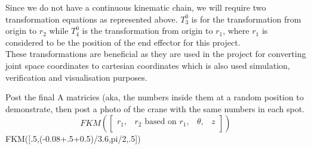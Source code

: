 \documentclass{UoNMCHA}
\numberwithin{equation}{section}
\begin{document}
	Since we do not have a continuous kinematic chain, we will require two transformation equations as represented above. $T_3^0$ is for the transformation from origin to $r_2$ while $T_4^0$ is the transformation from origin to $r_1$, where $r_1$ is considered to be the position of the end effector for this project. \\
	These transformations are beneficial as they are used in the project for converting joint space coordinates to cartesian coordinates which is also used simulation, verification and visualisation purposes.
	
	Post the final A matricies (aka, the numbers inside them at a random position to demonstrate, then post a photo of the crane with the same numbers in each spot.  \\
	
	\begin{equation*}
	FKM (\begin{bmatrix}
	r_1 ,& r_2 \text{ based on }r_1 , & \theta , & z \\
	\end{bmatrix} )
	\end{equation*}
	FKM([.5,(-0.08+.5+0.5)/3.6,pi/2,.5])
	
\end{document}
